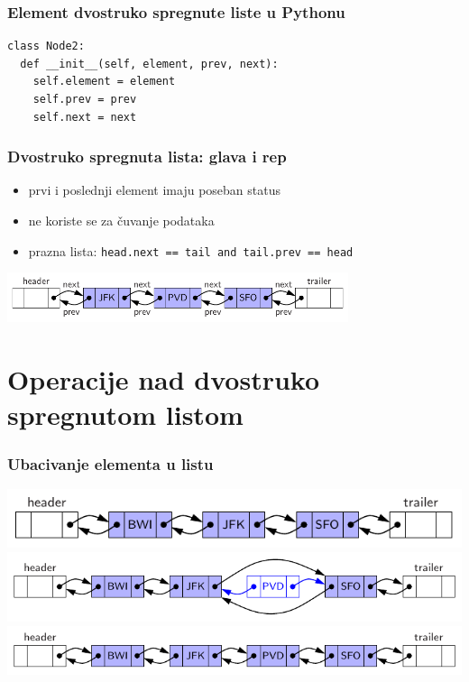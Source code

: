 \documentclass[compress]{beamer}
\begin{document}
\begin{frame}[fragile]
  \frametitle{Element dvostruko spregnute liste u Pythonu}
\begin{verbatim}
class Node2:
  def __init__(self, element, prev, next):
    self.element = element
    self.prev = prev
    self.next = next
\end{verbatim}
\end{frame}

\begin{frame}[fragile]
  \frametitle{Dvostruko spregnuta lista: glava i rep}
  \begin{itemize}
    \item prvi i poslednji element imaju poseban status
    \item ne koriste se za čuvanje podataka
    \item prazna lista: \texttt{head.next == tail and tail.prev == head}
  \end{itemize}
  \begin{center}
    \includegraphics[width=10cm]{asp-07-pic07.pdf}
  \end{center}
\end{frame}

\section[Operacije]{Operacije nad dvostruko spregnutom listom}
\begin{frame}[fragile]
  \frametitle{Ubacivanje elementa u listu}
  \begin{center}
    \includegraphics[scale=0.9]{asp-07-pic08a.pdf} \\
    \includegraphics[scale=0.9]{asp-07-pic08b.pdf} \\
    \includegraphics[scale=0.9]{asp-07-pic08c.pdf}
  \end{center}
\end{frame}
\end{document}

